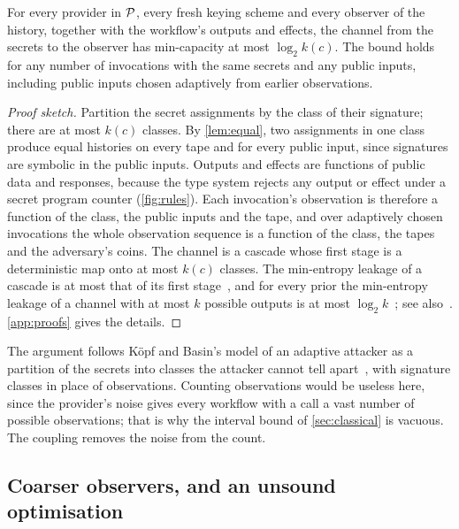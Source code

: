 \begin{theorem}\label{thm:leakage}
For every provider in $\mathcal{P}$, every fresh keying scheme and every observer of the
history, together with the workflow's outputs and effects, the channel from the
secrets to the observer has min-capacity at most $\log_2 k(c)$. The bound holds for
any number of invocations with the same secrets and any public inputs, including
public inputs chosen adaptively from earlier observations.
\end{theorem}

\begin{proof}[Proof sketch]
Partition the secret assignments by the class of their signature; there are at
most $k(c)$ classes. By \cref{lem:equal}, two assignments in one class produce equal
histories on every tape and for every public input, since signatures are symbolic
in the public inputs. Outputs and effects are functions of public data and
responses, because the type system rejects any output or effect under a secret
program counter (\cref{fig:rules}). Each invocation's observation is therefore a
function of the class, the public inputs and the tape, and over adaptively chosen
invocations the whole observation sequence is a function of the class, the tapes
and the adversary's coins. The channel is a cascade whose first stage is a
deterministic map onto at most $k(c)$ classes. The min-entropy leakage of a cascade
is at most that of its first stage~\cite{espinoza2012min}, and for every prior the
min-entropy leakage of a channel with at most $k$ possible outputs is at most
$\log_2 k$~\cite[Theorem 1]{doychev2013cacheaudit}; see also~\cite{kopf2010vulnerability}.
\ref{app:proofs} gives the details.
\end{proof}

The argument follows Köpf and Basin's model of an adaptive attacker as a partition
of the secrets into classes the attacker cannot tell apart~\cite{kopf2007information},
with signature classes in place of observations. Counting observations would
be useless here, since the provider's noise gives every workflow with a call a vast
number of possible observations; that is why the interval bound of
\cref{sec:classical} is vacuous. The coupling removes the noise from the count.

\subsection{Coarser observers, and an unsound optimisation}\label{sec:coarser}

